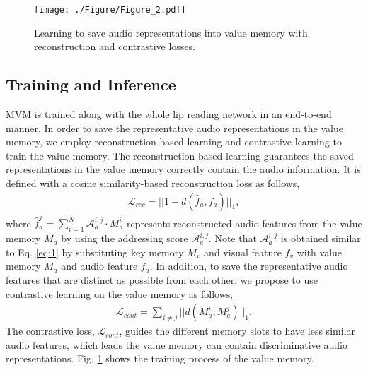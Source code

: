 \documentclass[letterpaper]{article} \usepackage{aaai22}  \usepackage{times}  \usepackage{helvet}  \usepackage{courier}  \usepackage[hyphens]{url}  \usepackage{graphicx} \urlstyle{rm} \def\UrlFont{\rm}  \usepackage{natbib}  \usepackage{caption} \DeclareCaptionStyle{ruled}{labelfont=normalfont,labelsep=colon,strut=off} \frenchspacing  \setlength{\pdfpagewidth}{8.5in}  \setlength{\pdfpageheight}{11in}  \usepackage{algorithm}
\begin{document}
\begin{figure}[t!]
	\begin{minipage}[b]{1.0\linewidth}
		\centering
		\centerline{\texttt{[image: ./Figure/Figure\_2.pdf]}}
	\end{minipage}
	\caption{Learning to save audio representations into value memory with reconstruction and contrastive losses.}
	\label{fig:2}
\end{figure}


\subsection{Training and Inference}
MVM is trained along with the whole lip reading network in an end-to-end manner. In order to save the representative audio representations in the value memory, we employ reconstruction-based learning and contrastive learning to train the value memory. The reconstruction-based learning guarantees the saved representations in the value memory correctly contain the audio information. It is defined with a cosine similarity-based reconstruction loss as follows,
\begin{align}
    \mathcal{L}_{rec}= ||1 - d(\hat{f}_a,f_a)||_1,
\end{align}
where $\hat{f}^j_a=\sum^N_{i=1}\mathcal{A}_a^{i,j}\cdot M_a^i$ represents reconstructed audio features from the value memory $M_a$ by using the addressing score $\mathcal{A}_a^{i,j}$. Note that $\mathcal{A}_a^{i,j}$ is obtained similar to Eq. \ref{eq:1} by substituting key memory $M_v$ and visual feature $f_v$ with value memory $M_a$ and audio feature $f_a$. In addition, to save the representative audio features that are distinct as possible from each other, we propose to use contrastive learning on the value memory as follows,
\begin{align}
    \mathcal{L}_{cont}= \sum_{i\neq j} ||d(M_a^i,M_a^j)||_1.
\end{align}
The contrastive loss, $\mathcal{L}_{cont}$, guides the different memory slots to have less similar audio features, which leads the value memory can contain discriminative audio representations. Fig. \ref{fig:2} shows the training process of the value memory.
\end{document}

